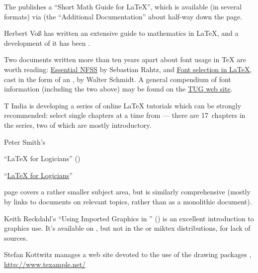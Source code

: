 
The  publishes a ``Short Math Guide for \LaTeX{}'', which is
available (in several formats) via
 (the ``Additional
Documentation'' about half-way down the page.

Herbert Vo\ss {} has written an extensive guide to mathematics in
\LaTeX{}, and a development of it has been %
.

Two documents written more than ten years apart about font usage in
\TeX{} are worth reading: %
\href{http://www.tug.org/TUGboat/Articles/tb14-2/tb39rahtz-nfss.pdf}{Essential NFSS}
by Sebastian Rahtz, and %
\href{http://tug.org/pracjourn/2006-1/schmidt/schmidt.pdf}{Font selection in LaTeX},
cast in the form of an , by Walter Schmidt.  A general
compendium of font information (including the two above) may be found
on the \href{http://www.tug.org/fonts/}{TUG web site}.

T India is developing a series of online \LaTeX{} tutorials
which can be strongly recommended: select single chapters at a time
from \nobreakspace--- there
are 17~chapters in the series, two of which are mostly introductory.

Peter Smith's
\begin{narrowversion}
  ``\LaTeX{} for Logicians''
  ()
\end{narrowversion}
\begin{wideversion}
  ``\href{http://www.logicmatters.net/latex-for-logicians/}{\LaTeX{} for Logicians}''
\end{wideversion}
page covers a rather smaller subject area, but is similarly comprehensive
(mostly by links to documents on relevant topics, rather than as a
monolithic document).

Keith Reckdahl's ``Using Imported Graphics in \LaTeXe{}''
() is an
excellent introduction to graphics use.  It's available on
, but not in the \texlive{} or miktex{} distributions, for
lack of sources.

Stefan Kottwitz manages a web site devoted to the use of the drawing
packages %
, %
\url{http://www.texample.net/}

